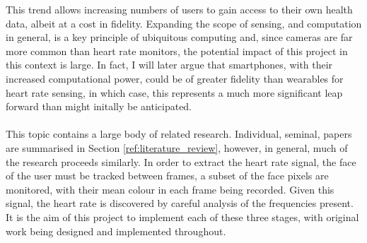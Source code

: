 This trend allows increasing numbers of users to gain access to their own health data, albeit at a cost in fidelity.
Expanding the scope of sensing, and computation in general, is a key principle of ubiquitous computing and, since cameras are far more common than heart rate monitors, the potential impact of this project in this context is large. 
In fact, I will later argue that smartphones, with their increased computational power, 
could be of greater fidelity than wearables for heart rate sensing, in which case, this represents a much more significant 
leap forward than might initally be anticipated.
\\\\
This topic contains a large body of related research.
Individual, seminal, papers are summarised in Section \ref{ref:literature_review}, however, in general, much of the research proceeds similarly. 
In order to extract the heart rate signal, the face of the user must be tracked between frames, a subset of the face pixels are monitored, with their mean colour in each frame being recorded.
Given this signal, the heart rate is discovered by careful analysis of the frequencies present. 
It is the aim of this project to implement each of these three stages, with original work being designed and implemented throughout. 




